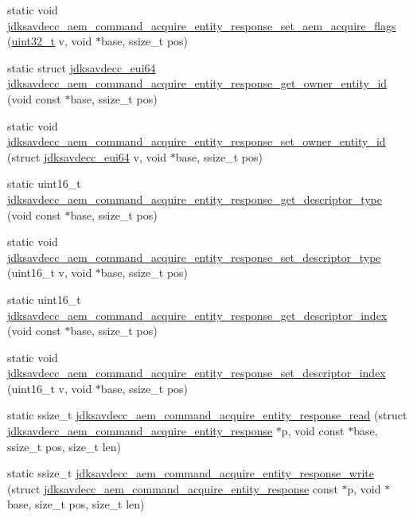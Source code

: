 \begin{DoxyCompactItemize}
static void \hyperlink{group__command__acquire__entity__response_gaf03752930972b453cf5c62cec8200283}{jdksavdecc\+\_\+aem\+\_\+command\+\_\+acquire\+\_\+entity\+\_\+response\+\_\+set\+\_\+aem\+\_\+acquire\+\_\+flags} (\hyperlink{parse_8c_a6eb1e68cc391dd753bc8ce896dbb8315}{uint32\+\_\+t} v, void $\ast$base, ssize\+\_\+t pos)
\item 
static struct \hyperlink{structjdksavdecc__eui64}{jdksavdecc\+\_\+eui64} \hyperlink{group__command__acquire__entity__response_gab60b0294258e92ba79099110565bce72}{jdksavdecc\+\_\+aem\+\_\+command\+\_\+acquire\+\_\+entity\+\_\+response\+\_\+get\+\_\+owner\+\_\+entity\+\_\+id} (void const $\ast$base, ssize\+\_\+t pos)
\item 
static void \hyperlink{group__command__acquire__entity__response_ga76c3005f40fb598f52d6e49750467efb}{jdksavdecc\+\_\+aem\+\_\+command\+\_\+acquire\+\_\+entity\+\_\+response\+\_\+set\+\_\+owner\+\_\+entity\+\_\+id} (struct \hyperlink{structjdksavdecc__eui64}{jdksavdecc\+\_\+eui64} v, void $\ast$base, ssize\+\_\+t pos)
\item 
static uint16\+\_\+t \hyperlink{group__command__acquire__entity__response_ga89a79f0364a5e4c2487f48fe4cf53dd2}{jdksavdecc\+\_\+aem\+\_\+command\+\_\+acquire\+\_\+entity\+\_\+response\+\_\+get\+\_\+descriptor\+\_\+type} (void const $\ast$base, ssize\+\_\+t pos)
\item 
static void \hyperlink{group__command__acquire__entity__response_ga0fc8cc3812c7c7e277fd5d42ad50a055}{jdksavdecc\+\_\+aem\+\_\+command\+\_\+acquire\+\_\+entity\+\_\+response\+\_\+set\+\_\+descriptor\+\_\+type} (uint16\+\_\+t v, void $\ast$base, ssize\+\_\+t pos)
\item 
static uint16\+\_\+t \hyperlink{group__command__acquire__entity__response_ga250a3521fec9da2e6b8dd42cb3efdef8}{jdksavdecc\+\_\+aem\+\_\+command\+\_\+acquire\+\_\+entity\+\_\+response\+\_\+get\+\_\+descriptor\+\_\+index} (void const $\ast$base, ssize\+\_\+t pos)
\item 
static void \hyperlink{group__command__acquire__entity__response_gaa3db248df6f9f2838923d561fc5bc084}{jdksavdecc\+\_\+aem\+\_\+command\+\_\+acquire\+\_\+entity\+\_\+response\+\_\+set\+\_\+descriptor\+\_\+index} (uint16\+\_\+t v, void $\ast$base, ssize\+\_\+t pos)
\item 
static ssize\+\_\+t \hyperlink{group__command__acquire__entity__response_ga2eba02e65645b4bd3367333fe0c99df5}{jdksavdecc\+\_\+aem\+\_\+command\+\_\+acquire\+\_\+entity\+\_\+response\+\_\+read} (struct \hyperlink{structjdksavdecc__aem__command__acquire__entity__response}{jdksavdecc\+\_\+aem\+\_\+command\+\_\+acquire\+\_\+entity\+\_\+response} $\ast$p, void const $\ast$base, ssize\+\_\+t pos, size\+\_\+t len)
\item 
static ssize\+\_\+t \hyperlink{group__command__acquire__entity__response_gaa1e4a5c3389e750f233c49481aaa443d}{jdksavdecc\+\_\+aem\+\_\+command\+\_\+acquire\+\_\+entity\+\_\+response\+\_\+write} (struct \hyperlink{structjdksavdecc__aem__command__acquire__entity__response}{jdksavdecc\+\_\+aem\+\_\+command\+\_\+acquire\+\_\+entity\+\_\+response} const $\ast$p, void $\ast$base, size\+\_\+t pos, size\+\_\+t len)
\end{DoxyCompactItemize}


